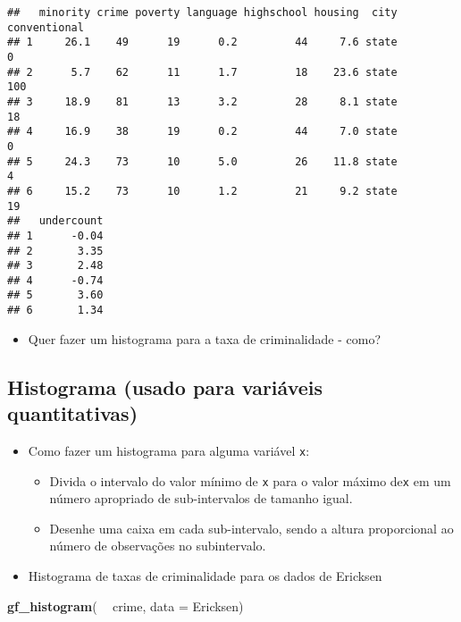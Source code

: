 \documentclass[]{article}
\newenvironment{Shaded}{\begin{snugshade}}{\end{snugshade}}
\newcommand{\KeywordTok}[1]{\textcolor[rgb]{0.13,0.29,0.53}{\textbf{#1}}}
\newcommand{\DataTypeTok}[1]{\textcolor[rgb]{0.13,0.29,0.53}{#1}}
\newcommand{\StringTok}[1]{\textcolor[rgb]{0.31,0.60,0.02}{#1}}
\newcommand{\OperatorTok}[1]{\textcolor[rgb]{0.81,0.36,0.00}{\textbf{#1}}}
\newcommand{\NormalTok}[1]{#1}
\providecommand{\tightlist}{%
  \setlength{\itemsep}{0pt}\setlength{\parskip}{0pt}}
\begin{document}
\begin{verbatim}
##   minority crime poverty language highschool housing  city conventional
## 1     26.1    49      19      0.2         44     7.6 state            0
## 2      5.7    62      11      1.7         18    23.6 state          100
## 3     18.9    81      13      3.2         28     8.1 state           18
## 4     16.9    38      19      0.2         44     7.0 state            0
## 5     24.3    73      10      5.0         26    11.8 state            4
## 6     15.2    73      10      1.2         21     9.2 state           19
##   undercount
## 1      -0.04
## 2       3.35
## 3       2.48
## 4      -0.74
## 5       3.60
## 6       1.34
\end{verbatim}

\begin{itemize}
\tightlist
\item
  Quer fazer um histograma para a taxa de criminalidade - como?
\end{itemize}

\subsection{Histograma (usado para variáveis
quantitativas)}\label{histograma-usado-para-variaveis-quantitativas}

\begin{itemize}
\tightlist
\item
  Como fazer um histograma para alguma variável \texttt{x}:

  \begin{itemize}
  \tightlist
  \item
    Divida o intervalo do valor mínimo de \texttt{x} para o valor máximo
    de\texttt{x} em um número apropriado de sub-intervalos de tamanho
    igual.
  \item
    Desenhe uma caixa em cada sub-intervalo, sendo a altura proporcional
    ao número de observações no subintervalo.
  \end{itemize}
\item
  Histograma de taxas de criminalidade para os dados de Ericksen
\end{itemize}

\begin{Shaded}
\begin{Highlighting}[]
\KeywordTok{gf_histogram}\NormalTok{( }\OperatorTok{~}\StringTok{ }\NormalTok{crime, }\DataTypeTok{data =}\NormalTok{ Ericksen)}
\end{Highlighting}
\end{Shaded}
\end{document}
